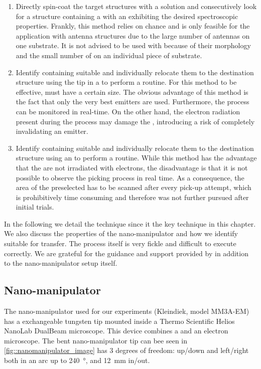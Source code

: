 	\begin{enumerate}
		\item Directly spin-coat the target structures with a \nd solution and consecutively look for a structure containing a \nd with an \siv exhibiting the desired spectroscopic properties. Frankly, this method relies on chance and is only feasible for the application with antenna structures due to the large number of antennas on one substrate. It is not advised to be used with \VCSELs because of their morphology and the small number of \VCSELs on an individual piece of substrate.

		\item Identify \nds containing suitable \sivs and individually relocate them to the destination structure using the tip in a \sem to perform a \pp routine. For this method to be effective, \nds must have a certain size. The obvious advantage of this method is the fact that only the very best emitters are used. Furthermore, the \pp process can be monitored in real-time. On the other hand, the electron radiation present during the \pp process may damage the \siv, introducing a risk of completely invalidating an emitter.

		\item Identify \nds containing suitable \sivs and individually relocate them to the destination structure using an \afm to perform a \pp routine. While this method has the advantage that the \nds are not irradiated with electrons, the disadvantage is that it is not possible to  observe the picking process in real time. As a consequence, the area of the preselected \nd has to be scanned after every pick-up attempt, which is prohibitively time consuming and therefore was not further pursued after initial trials.
	\end{enumerate}

		In the following we detail the \pp technique since it the key technique in this chapter. We also discuss the properties of the nano-manipulator and how we identify \nds suitable for \pp transfer. The \pp process itself is very fickle and difficult to execute correctly. We are grateful for the guidance and support provided by \pauly in addition to the nano-manipulator setup itself.
		\\
	\subsection{Nano-manipulator} \label{subsec::nanomanipulator}

		The nano-manipulator used for our experiments (Kleindiek, model MM3A-EM) has a exchangeable tungsten tip
	  mounted inside a Thermo Scientific\texttrademark{} Helios NanoLab\texttrademark{} DualBeam\texttrademark{} microscope. This device combines a \fib and an electron microscope.
		The bent nano-manipulator tip can bee seen in \autoref{fig::nanomanipulator_image} has $3$ degrees of freedom: up/down and left/right both in an arc up to \SI{240}{\degree}, and \SI{12}{\milli\metre} in/out.

